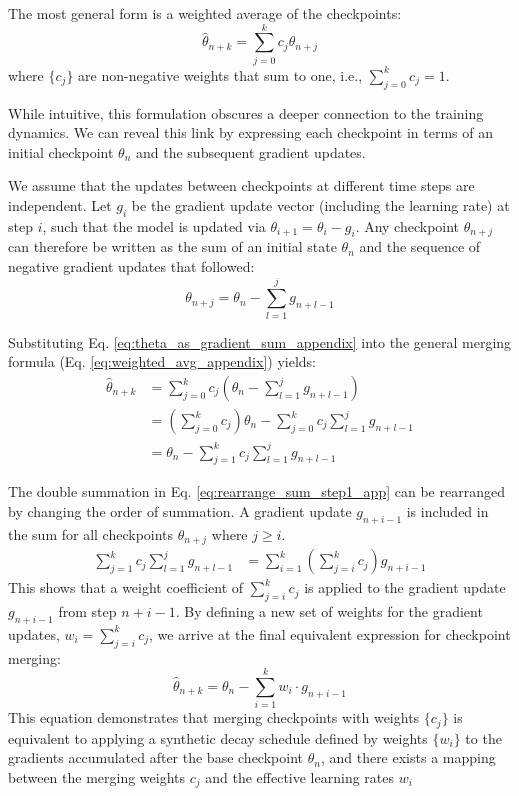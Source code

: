 The most general form is a weighted average of the checkpoints:
\begin{equation}
    \hat{\theta}_{n+k} = \sum_{j=0}^{k} c_j \theta_{n+j}
    \label{eq:weighted_avg_appendix}
\end{equation}
where $\{c_j\}$ are non-negative weights that sum to one, i.e., $\sum_{j=0}^{k} c_j = 1$.

While intuitive, this formulation obscures a deeper connection to the training dynamics. We can reveal this link by expressing each checkpoint in terms of an initial checkpoint $\theta_n$ and the subsequent gradient updates.

We assume that the updates between checkpoints at different time steps are independent. Let $g_{i}$ be the gradient update vector (including the learning rate) at step $i$, such that the model is updated via $\theta_{i+1} = \theta_i - g_i$. Any checkpoint $\theta_{n+j}$ can therefore be written as the sum of an initial state $\theta_n$ and the sequence of negative gradient updates that followed:
\begin{equation}
    \theta_{n+j} = \theta_{n} - \sum_{l=1}^{j} g_{n+l-1}
    \label{eq:theta_as_gradient_sum_appendix}
\end{equation}

Substituting Eq. \ref{eq:theta_as_gradient_sum_appendix} into the general merging formula (Eq. \ref{eq:weighted_avg_appendix}) yields:
\begin{align}
    \hat{\theta}_{n+k} &= \sum_{j=0}^{k} c_j \left( \theta_n - \sum_{l=1}^{j} g_{n+l-1} \right) \\
    &= \left( \sum_{j=0}^{k} c_j \right) \theta_n - \sum_{j=0}^{k} c_j \sum_{l=1}^{j} g_{n+l-1} \\
    &= \theta_n - \sum_{j=1}^{k} c_j \sum_{l=1}^{j} g_{n+l-1} \label{eq:rearrange_sum_step1_app}
\end{align}

The double summation in Eq. \ref{eq:rearrange_sum_step1_app} can be rearranged by changing the order of summation. A gradient update $g_{n+i-1}$ is included in the sum for all checkpoints $\theta_{n+j}$ where $j \ge i$.
\begin{align}
    \sum_{j=1}^{k} c_j \sum_{l=1}^{j} g_{n+l-1} &= \sum_{i=1}^{k} \left( \sum_{j=i}^{k} c_j \right) g_{n+i-1}
\end{align}
This shows that a weight coefficient of $\sum_{j=i}^{k} c_j$ is applied to the gradient update $g_{n+i-1}$ from step $n+i-1$.
By defining a new set of weights for the gradient updates, $w_i = \sum_{j=i}^{k} c_j$, we arrive at the final equivalent expression for checkpoint merging:
\begin{equation}
    \hat{\theta}_{n+k} = \theta_n - \sum_{i=1}^{k} w_i \cdot g_{n+i-1}
    \label{eq:merge_as_gradient_reweighting_app}
\end{equation}
This equation demonstrates that merging checkpoints with weights $\{c_j\}$ is equivalent to applying a synthetic decay schedule defined by weights $\{w_i\}$ to the gradients accumulated after the base checkpoint $\theta_n$, and there exists a mapping between the merging weights ${c_j}$ and the effective learning rates ${w_i}$
